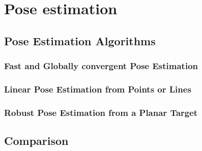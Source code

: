 \chapter{Pose estimation}\label{sect:chapter3}

\section{Pose Estimation Algorithms}

\subsection{Fast and Globally convergent Pose Estimation}

\subsection{Linear Pose Estimation from Points or Lines}

\subsection{Robust Pose Estimation from a Planar Target}

\section{Comparison}

